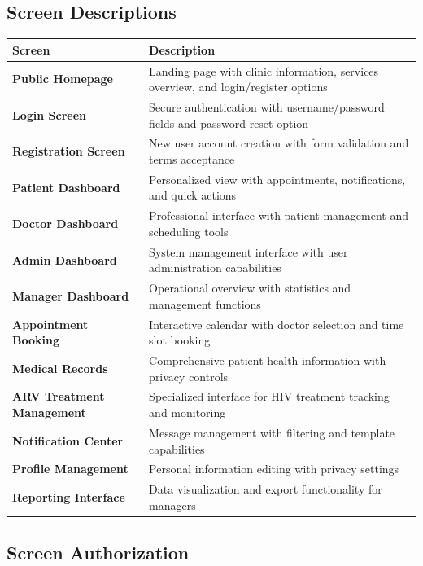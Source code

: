 \documentclass[12pt,a4paper]{article}
\begin{document}
\subsection{Screen Descriptions}

\begin{longtable}{|p{4cm}|p{10cm}|}
\hline
\textbf{Screen} & \textbf{Description} \\
\hline
\textbf{Public Homepage} & Landing page with clinic information, services overview, and login/register options \\
\hline
\textbf{Login Screen} & Secure authentication with username/password fields and password reset option \\
\hline
\textbf{Registration Screen} & New user account creation with form validation and terms acceptance \\
\hline
\textbf{Patient Dashboard} & Personalized view with appointments, notifications, and quick actions \\
\hline
\textbf{Doctor Dashboard} & Professional interface with patient management and scheduling tools \\
\hline
\textbf{Admin Dashboard} & System management interface with user administration capabilities \\
\hline
\textbf{Manager Dashboard} & Operational overview with statistics and management functions \\
\hline
\textbf{Appointment Booking} & Interactive calendar with doctor selection and time slot booking \\
\hline
\textbf{Medical Records} & Comprehensive patient health information with privacy controls \\
\hline
\textbf{ARV Treatment Management} & Specialized interface for HIV treatment tracking and monitoring \\
\hline
\textbf{Notification Center} & Message management with filtering and template capabilities \\
\hline
\textbf{Profile Management} & Personal information editing with privacy settings \\
\hline
\textbf{Reporting Interface} & Data visualization and export functionality for managers \\
\hline
\end{longtable}

\subsection{Screen Authorization}
\end{document}
